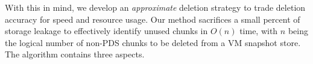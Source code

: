 With this in mind, we develop an {\em approximate} deletion strategy to trade deletion accuracy for
speed and resource usage. Our method sacrifices a small percent of storage leakage
to effectively identify unused chunks in $O(n)$ time, with $n$ being the logical number of non-PDS chunks 
to be deleted from a VM snapshot store.
The algorithm contains three aspects.


